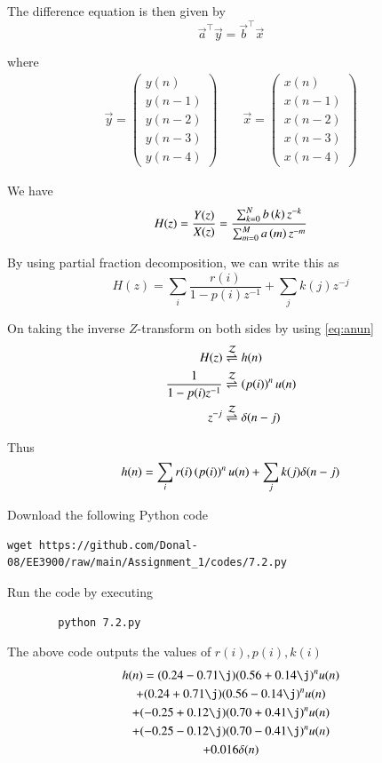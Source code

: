 \documentclass[journal,12pt,twocolumn]{IEEEtran}
\newcommand{\myvec}[1]{\ensuremath{\begin{pmatrix}#1\end{pmatrix}}}
\renewcommand\thesection{\arabic{section}}
\begin{document}
\begin{enumerate}[label=\thesection.\arabic*]
	The difference equation is then given by
	\begin{equation}
		\vec{a}^\top \vec{y} = \vec{b}^\top \vec{x} 
	\end{equation}
	
	where
	\begin{align}
		\vec{y} = \myvec{y(n) \\ y(n-1) \\ y(n-2) \\ y(n-3) \\ y(n-4)} \qquad
		\vec{x} = \myvec{x(n) \\ x(n-1) \\ x(n-2) \\ x(n-3) \\ x(n-4)}
	\end{align}
	
	We have
	\begin{equation}
		H(z) = \frac{Y(z)}{X(z)} = \frac{\sum _{k=0}^{N}b\left(k\right) z^{-k}}{\sum _{m=0}^{M}a\left(m\right) z^{-m}}
	\end{equation}
	
	By using partial fraction decomposition, we can write this as
	\begin{equation}
		H(z) = \sum_i \frac{r(i)}{1-p(i)z^{-1}} + \sum_j k(j)z^{-j}
	\end{equation}
	
	On taking the inverse $Z$-transform on both sides by using \eqref{eq:anun}
	\begin{align}
		H(z) &\overset{\mathcal{Z}}{ \rightleftharpoons} h(n) \\
		\frac{1}{1-p(i)z^{-1}} &\overset{\mathcal{Z}}{ \rightleftharpoons} \left(p(i)\right)^nu(n) \\
		z^{-j} &\overset{\mathcal{Z}}{ \rightleftharpoons} \delta(n-j) 
	\end{align}
	
	Thus
	\begin{align}
		h(n) = \sum_i r(i)\left(p(i)\right)^nu(n) + \sum_j k(j)\delta(n-j)
	\end{align}
	
	Download the following Python code
	\begin{lstlisting}
wget https://github.com/Donal-08/EE3900/raw/main/Assignment_1/codes/7.2.py
	\end{lstlisting}
	
	Run the code by executing
	\begin{lstlisting}
		python 7.2.py
	\end{lstlisting}
	
	The above code outputs the values of $r(i), p(i), k(i)$
	\begin{multline}
		h(n) = 
		 (0.24 - 0.71\j)(0.56 + 0.14\j)^n u(n) \\
		+ (0.24 + 0.71\j)(0.56 - 0.14\j)^n u(n) \\
		+ (-0.25 + 0.12\j)(0.70 + 0.41\j)^n u(n) \\
		+ (-0.25 - 0.12\j)(0.70 - 0.41\j)^n u(n) \\
		+ 0.016\delta(n)
	\end{multline}
	

\end{enumerate}
\end{document}
